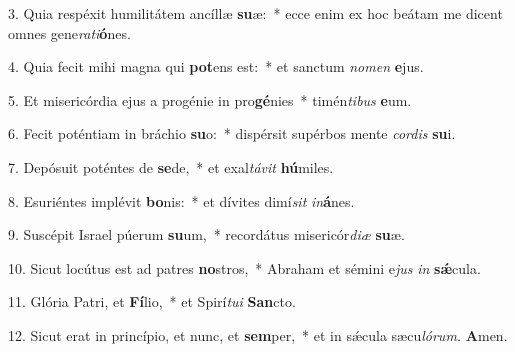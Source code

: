\item 3. Quia respéxit humilitátem ancíllæ \textbf{su}æ:~* ecce enim ex hoc beátam me dicent omnes gene\textit{rati}\textbf{ó}nes.

\item 4. Quia fecit mihi magna qui \textbf{pot}ens est:~* et sanctum \textit{nomen} \textbf{e}jus.

\item 5. Et misericórdia ejus a progénie in pro\textbf{gé}nies~* timén\textit{tibus} \textbf{e}um.

\item 6. Fecit poténtiam in bráchio \textbf{su}o:~* dispérsit supérbos mente \textit{cordis} \textbf{su}i.

\item 7. Depósuit poténtes de \textbf{se}de,~* et exal\textit{távit} \textbf{hú}miles.

\item 8. Esuriéntes implévit \textbf{bo}nis:~* et dívites dimí\hspace{0.04em}\textit{sit} \textit{in}\textbf{á}nes.

\item 9. Suscépit Israel púerum \textbf{su}um,~* recordátus misericór\textit{diæ} \textbf{su}æ.

\item 10. Sicut locútus est ad patres \textbf{no}stros,~* Abraham et sémini e\hspace{0.03em}\textit{jus} \textit{in} \textbf{sǽ}cula.

\item 11. Glória Patri, et \textbf{Fí}lio,~* et Spirí\textit{tui} \textbf{San}cto.

\item 12. Sicut erat in princípio, et nunc, et \textbf{sem}per,~* et in sǽcula sæcu\hspace{0.03em}\textit{lórum.} \textbf{A}men.